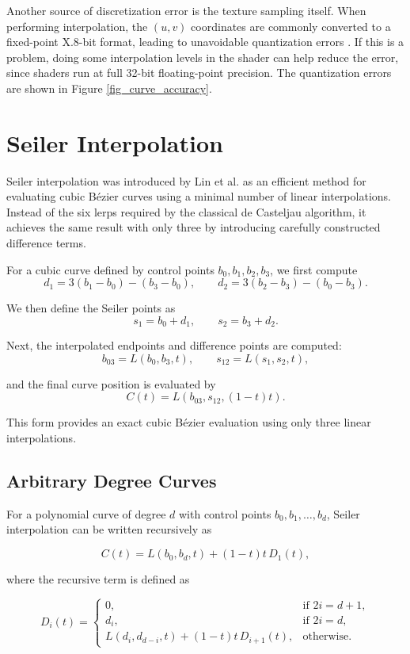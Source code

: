 \documentclass{jcgt}
\begin{document}
Another source of discretization error is the texture sampling itself. When performing interpolation, the $(u,v)$ coordinates are commonly converted to a fixed-point X.8-bit
format, leading to unavoidable quantization errors \cite{CUDA_PG}. If this is a problem, doing some interpolation levels in the shader can help reduce the error, since shaders run at full
32-bit floating-point precision. The quantization errors are shown in Figure \ref{fig_curve_accuracy}.

\section{Seiler Interpolation}
Seiler interpolation was introduced by Lin et al. \cite{lin2021hardware} as an efficient method for evaluating cubic Bézier curves using a minimal number of linear interpolations. 
Instead of the six lerps required by the classical de Casteljau algorithm, it achieves the same result with only three by introducing carefully constructed difference terms.

For a cubic curve defined by control points \(b_0, b_1, b_2, b_3\), we first compute
\[
d_1 = 3(b_1 - b_0) - (b_3 - b_0), \qquad
d_2 = 3(b_2 - b_3) - (b_0 - b_3).
\]

We then define the Seiler points as
\[
s_1 = b_0 + d_1, \qquad s_2 = b_3 + d_2.
\]

Next, the interpolated endpoints and difference points are computed:
\[
b_{03} = L(b_0, b_3, t), \qquad
s_{12} = L(s_1, s_2, t),
\]

and the final curve position is evaluated by
\[
C(t) = L(b_{03}, s_{12}, (1-t)t).
\]

This form provides an exact cubic Bézier evaluation using only three linear interpolations.

\subsection{Arbitrary Degree Curves}

For a polynomial curve of degree $d$ with control points 
$b_0, b_1, \dots, b_d$, Seiler interpolation can be written recursively as

\[
C(t) = L(b_0, b_d, t) + (1 - t)t \, D_1(t),
\]

where the recursive term is defined as

\[
D_i(t) =
\begin{cases}
0, & \text{if } 2i = d + 1, \\[6pt]
d_i, & \text{if } 2i = d, \\[6pt]
L(d_i, d_{d-i}, t) + (1 - t)t \, D_{i+1}(t), & \text{otherwise}.
\end{cases}
\]
\end{document}
